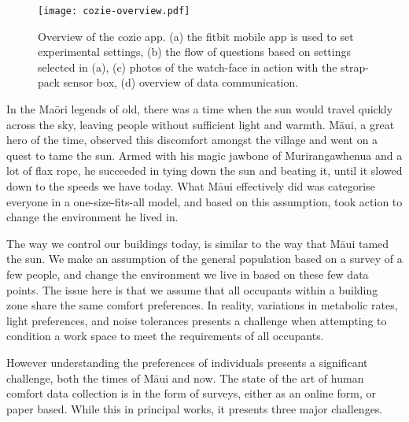 
\begin{figure}
\begin{center}
\texttt{[image: cozie-overview.pdf]}
\caption{Overview of the cozie app. (a) the fitbit mobile app is used to set experimental settings, (b) the flow of questions based on settings selected in (a), (c) photos of the watch-face in action with the strap-pack sensor box, (d) overview of data communication.}
\label{fig:homescreen}
\end{center}
\end{figure}

In the Ma\={o}ri legends of old, there was a time when the sun would travel quickly across the sky, leaving people without sufficient light and warmth. M\={a}ui, a great hero of the time, observed this discomfort amongst the village and went on a quest to tame the sun. Armed with his magic jawbone of Murirangawhenua and a lot of flax rope, he succeeded in tying down the sun and beating it, until it slowed down to the speeds we have today. What M\={a}ui effectively did was categorise everyone in a one-size-fits-all model, and based on this assumption, took action to change the environment he lived in. 

The way we control our buildings today, is similar to the way that M\={a}ui tamed the sun. We make an assumption of the general population based on a survey of a few people, and change the environment we live in based on these few data points. The issue here is that we assume that all occupants within a building zone share the same comfort preferences. In reality, variations in metabolic rates, light preferences, and noise tolerances presents a challenge when attempting to condition a work space to meet the requirements of all occupants. 

However understanding the preferences of individuals presents a significant challenge, both the times of M\={a}ui and now. The state of the art of human comfort data collection is in the form of surveys, either as an online form, or paper based. While this in principal works, it presents three major challenges.




